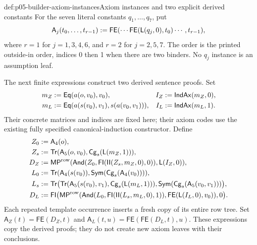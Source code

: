 \begin{hbdefinition}{def:p05-builder-axiom-instances}{Axiom instances and two explicit derived constants}
For the seven literal constants \(q_1,\ldots,q_7\), put
\[
 \mathsf A_j(t_0,\ldots,t_{r-1})\mathrel{:=}
  \mathsf{FE}(\cdots\mathsf{FE}(\mathsf L(q_j,0),t_0)\cdots,t_{r-1}),
\]
where \(r=1\) for \(j=1,3,4,6\), and \(r=2\) for \(j=2,5,7\).
The order is the printed outside-in order, indices 0 then 1 when there are
two binders. No \(q_j\) instance is an assumption leaf.

The next finite expressions construct two derived sentence proofs. Set
\[
\begin{aligned}
 m_Z&\mathrel{:=} \mathsf{Eq}(a(o,v_0),v_0),& I_Z&\mathrel{:=}\mathsf{IndAx}(m_Z,0),\\
 m_L&\mathrel{:=} \mathsf{Eq}(a(s(v_0),v_1),s(a(v_0,v_1))),&
 I_L&\mathrel{:=}\mathsf{IndAx}(m_L,1).
\end{aligned}
\]
Their concrete matrices and indices are fixed here; their axiom codes use
the existing fully specified canonical-induction constructor. Define
\[
\begin{aligned}
 Z_0&\mathrel{:=}\mathsf A_4(o),\\
 Z_s&\mathrel{:=}\mathsf{Tr}(\mathsf A_5(o,v_0),
                         \mathsf{Cg}_s(\mathsf L(m_Z,1))),\\
 D_Z&\mathrel{:=}\mathsf{MP}^{\rm row}
  (\mathsf{And}(Z_0,\mathsf{FI}(\mathsf{II}(Z_s,m_Z,0),0)),
                                                     \mathsf L(I_Z,0)),\\
 L_0&\mathrel{:=}\mathsf{Tr}(\mathsf A_4(s(v_0)),
                              \mathsf{Sym}(\mathsf{Cg}_s(\mathsf A_4(v_0)))),\\
 L_s&\mathrel{:=}\mathsf{Tr}\bigl(
       \mathsf{Tr}(\mathsf A_5(s(v_0),v_1),
                           \mathsf{Cg}_s(\mathsf L(m_L,1))),
                         \mathsf{Sym}(\mathsf{Cg}_s(\mathsf A_5(v_0,v_1)))\bigr),\\
 D_L&\mathrel{:=}\mathsf{FI}\bigl(
   \mathsf{MP}^{\rm row}
    (\mathsf{And}(L_0,\mathsf{FI}(\mathsf{II}(L_s,m_L,0),1)),
                                   \mathsf{FE}(\mathsf L(I_L,0),v_0)),0\bigr).
\end{aligned}
\]
Each repeated template occurrence inserts a fresh copy of its entire row
tree. Set \(\mathsf A_Z(t)=\mathsf{FE}(D_Z,t)\) and
\(\mathsf A_L(t,u)=\mathsf{FE}(\mathsf{FE}(D_L,t),u)\).
These expressions copy the derived proofs; they do not create new axiom
leaves with their conclusions.
\end{hbdefinition}


